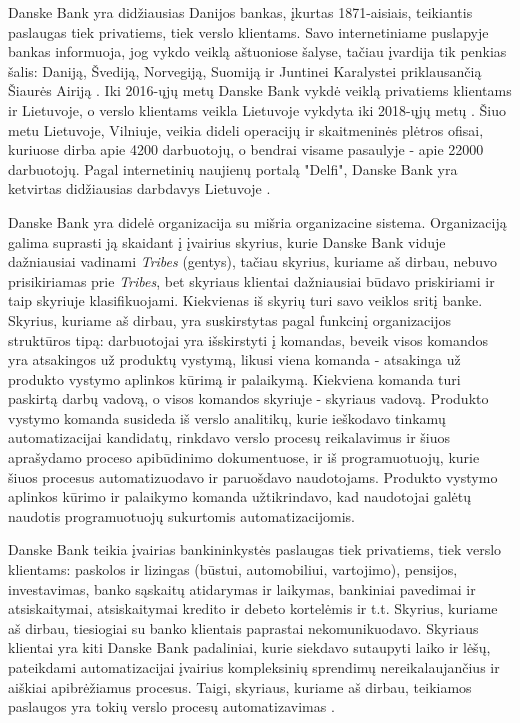 \documentclass{VUMIFPSBakPrakAt}
\begin{document}
Danske Bank yra didžiausias Danijos bankas, įkurtas 1871-aisiais, teikiantis paslaugas tiek privatiems, tiek verslo klientams. Savo internetiniame puslapyje bankas informuoja, jog vykdo veiklą aštuoniose šalyse, tačiau įvardija tik penkias šalis: Daniją, Švediją, Norvegiją, Suomiją ir Juntinei Karalystei priklausančią Šiaurės Airiją \cite{DanskeAbout, DanskeAboutLT}. Iki 2016-ųjų metų Danske Bank vykdė veiklą privatiems klientams ir Lietuvoje, o verslo klientams veikla Lietuvoje vykdyta iki 2018-ųjų metų \cite{DanskePasitraukimas}. Šiuo metu Lietuvoje, Vilniuje, veikia dideli operacijų ir skaitmeninės plėtros ofisai, kuriuose dirba apie 4200 darbuotojų, o bendrai visame pasaulyje - apie 22000 darbuotojų. Pagal internetinių naujienų portalą "Delfi", Danske Bank yra ketvirtas didžiausias darbdavys Lietuvoje \cite{DanskeDydis}.
\par
Danske Bank yra didelė organizacija su mišria organizacine sistema. Organizaciją galima suprasti ją skaidant į įvairius skyrius, kurie Danske Bank viduje dažniausiai vadinami \textit{Tribes} (gentys), tačiau skyrius, kuriame aš dirbau, nebuvo prisikiriamas prie \textit{Tribes}, bet skyriaus klientai dažniausiai būdavo priskiriami ir taip skyriuje klasifikuojami. Kiekvienas iš skyrių turi savo veiklos sritį banke. Skyrius, kuriame aš dirbau, yra suskirstytas pagal funkcinį organizacijos struktūros tipą: darbuotojai yra išskirstyti į komandas, beveik visos komandos yra atsakingos už produktų vystymą, likusi viena komanda - atsakinga už produkto vystymo aplinkos kūrimą ir palaikymą. Kiekviena komanda turi paskirtą darbų vadovą, o visos komandos skyriuje - skyriaus vadovą. Produkto vystymo komanda susideda iš verslo analitikų, kurie ieškodavo tinkamų automatizacijai kandidatų, rinkdavo verslo procesų reikalavimus ir šiuos aprašydamo proceso apibūdinimo dokumentuose, ir iš programuotuojų, kurie šiuos procesus automatizuodavo ir paruošdavo naudotojams. Produkto vystymo aplinkos kūrimo ir palaikymo komanda užtikrindavo, kad naudotojai galėtų naudotis programuotuojų sukurtomis automatizacijomis.
\par
Danske Bank teikia įvairias bankininkystės paslaugas tiek privatiems, tiek verslo klientams: paskolos ir lizingas (būstui, automobiliui, vartojimo), pensijos, investavimas, banko sąskaitų atidarymas ir laikymas, bankiniai pavedimai ir atsiskaitymai, atsiskaitymai kredito ir debeto kortelėmis ir t.t. Skyrius, kuriame aš dirbau, tiesiogiai su banko klientais paprastai nekomunikuodavo. Skyriaus klientai yra kiti Danske Bank padaliniai, kurie siekdavo sutaupyti laiko ir lėšų, pateikdami automatizacijai įvairius kompleksinių sprendimų nereikalaujančius ir aiškiai apibrėžiamus procesus. Taigi, skyriaus, kuriame aš dirbau, teikiamos paslaugos yra tokių verslo procesų automatizavimas \cite{DanskeIACoEJOB}.
\end{document}

